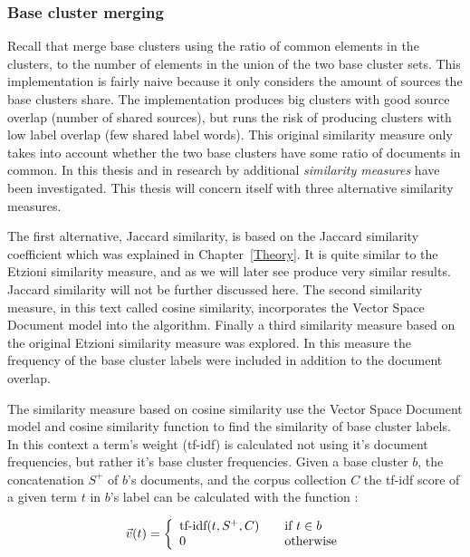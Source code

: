 \subsubsection{Base cluster merging}
\label{subsubsec:baseclustermerging}
Recall that \cite{Oren1998} merge base clusters using the ratio of common elements in the clusters, to the number of elements in the union of the two base cluster sets. This implementation is fairly naive because it only considers the amount of sources the base clusters share. The implementation produces big clusters with good source overlap (number of shared sources), but runs the risk of producing clusters with low label overlap (few shared label words). This original similarity measure only takes into account whether the two base clusters have some ratio of documents in common. In this thesis and in research by \citeauthor{Moe2014,Moe2014future} additional \emph{similarity measures} have been investigated. This thesis will concern itself with three alternative similarity measures.

The first alternative, Jaccard similarity, is based on the Jaccard similarity coefficient which was explained in Chapter~\ref{Theory}. It is quite similar to the Etzioni similarity measure, and as we will later see produce very similar results. Jaccard similarity will not be further discussed here. The second similarity measure, in this text called cosine similarity, incorporates the Vector Space Document model into the \CTC algorithm. Finally a third similarity measure based on the original Etzioni similarity measure was explored. In this measure the frequency of the base cluster labels were included in addition to the document overlap.

The similarity measure based on cosine similarity use the Vector Space Document model and cosine similarity function to find the similarity of base cluster labels. In this context a term's weight (tf-idf) is calculated not using it's document frequencies, but rather it's base cluster frequencies. Given a base cluster \(b\), the concatenation \(S^+\) of \(b\)'s documents, and the corpus collection \(C\) the tf-idf score of a given term \(t\) in \(b\)'s label can be calculated with the function \parencite{Moe2014}:

\begin{displaymath}
\vec{v}(t) = \left\{
  \begin{array}{l l}
    \text{tf-idf}(t, S^+, C) & \quad \text{if $t \in b$}\\
    0 & \quad \text{otherwise}
  \end{array} \right.
\end{displaymath}

